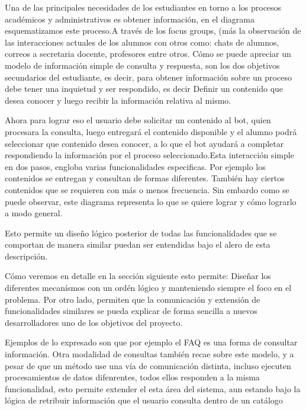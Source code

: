         \par Una de las principales necesidades de los estudiantes en torno a los procesos académicos y administrativos es obtener información, en el diagrama esquematizamos este proceso.A través de los focus groups, (más la observación de las interacciones actuales de los alumnos con otros como: chats de alumnos, correos a secretaria docente, profesores entre otros. Cómo se puede apreciar un modelo de información simple de consulta y respuesta, son los dos objetivos secundarios del estudiante, es decir, para obtener información sobre un proceso debe tener una inquietud y ser respondido, es decir Definir un contenido que desea conocer y luego recibir la información relativa al mismo.
        \par Ahora para lograr eso el usuario debe solicitar un contenido al bot, quien procesara la consulta, luego entregará el contenido disponible y el alumno podrá seleccionar que contenido desea conocer, a lo que el bot ayudará a completar respondiendo la información por el proceso seleccionado.Esta interacción simple en dos pasos, engloba varias funcionalidades especificas. Por ejemplo los contenidos se entregan y consultan de formas diferentes. También hay ciertos contenidos que se requieren con más o menos frecuencia. Sin embardo como se puede observar, este diagrama representa lo que se quiere lograr y cómo lograrlo a modo general.
        \par Esto permite un diseño lógico posterior de todas las funcionalidades que se comportan de manera similar puedan ser entendidas bajo el alero de esta descripción.
        \par Cómo veremos en detalle en la sección siguiente esto permite: Diseñar los diferentes mecanísmos con un ordén lógico y manteniendo siempre el foco en el problema. Por otro lado, permiten que la comunicación y extensión de funcionalidades similares se pueda explicar de forma sencilla a nuevos desarrolladores uno de los objetivos del proyecto. 
        \par Ejemplos de lo expresado son que por ejemplo el FAQ es una forma de consultar información. Otra modalidad de consultas también recae sobre este modelo, y a pesar de que un método use una vía de comunicación distinta, incluso ejecuten procesamientos de datos difenrentes, todos ellos responden a la misma funcionalidad, esto permite extender el esta área del sistema, aun estando bajo la lógica de retribuir información que el usuario consulta dentro de un catálogo
    
